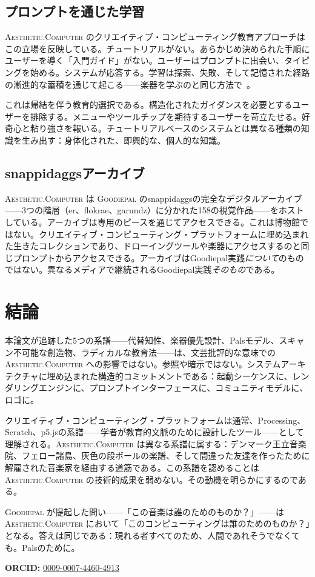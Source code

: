 \documentclass[10pt,letterpaper,twocolumn]{article}
\newcommand{\ac}{\textsc{Aesthetic.Computer}}
\newcommand{\gp}{\textsc{Goodiepal}}
\begin{document}
\subsection{プロンプトを通じた学習}

\ac{} のクリエイティブ・コンピューティング教育アプローチはこの立場を反映している。チュートリアルがない。あらかじめ決められた手順にユーザーを導く「入門ガイド」がない。ユーザーはプロンプトに出会い、タイピングを始める。システムが応答する。学習は探索、失敗、そして記憶された経路の漸進的な蓄積を通じて起こる——楽器を学ぶのと同じ方法で~\citep{papert1980mindstorms}。

これは帰結を伴う教育的選択である。構造化されたガイダンスを必要とするユーザーを排除する。メニューやツールチップを期待するユーザーを苛立たせる。好奇心と粘り強さを報いる。チュートリアルベースのシステムとは異なる種類の知識を生み出す：身体化された、即興的な、個人的な知識。

\subsection{snappidaggsアーカイブ}

\ac{} は \gp{} のsnappidaggsの完全なデジタルアーカイブ——3つの階層（er、flokrae、garundz）に分かれた158の視覚作品——をホストしている。アーカイブは専用のピースを通じてアクセスできる。これは博物館ではない。クリエイティブ・コンピューティング・プラットフォームに埋め込まれた生きたコレクションであり、ドローイングツールや楽器にアクセスするのと同じプロンプトからアクセスできる。アーカイブはGoodiepal実践\emph{について}のものではない。異なるメディアで継続されるGoodiepal実践\emph{そのもの}である。

\section{結論}

本論文が追跡した5つの系譜——代替知性、楽器優先設計、Palsモデル、スキャン不可能な創造物、ラディカルな教育法——は、文芸批評的な意味での \ac{} への影響ではない。参照や暗示ではない。システムアーキテクチャに埋め込まれた構造的コミットメントである：起動シーケンスに、レンダリングエンジンに、プロンプトインターフェースに、コミュニティモデルに、ロゴに。

クリエイティブ・コンピューティング・プラットフォームは通常、Processing、Scratch、p5.jsの系譜——学者が教育的文脈のために設計したツール——として理解される。\ac{} は異なる系譜に属する：デンマーク王立音楽院、フェロー諸島、灰色の段ボールの楽譜、そして間違った友達を作ったために解雇された音楽家を経由する道筋である。この系譜を認めることは \ac{} の技術的成果を弱めない。その動機を明らかにするのである。

\gp{} が提起した問い——「この音楽は誰のためのものか？」——は \ac{} において「このコンピューティングは誰のためのものか？」となる。答えは同じである：現れる者すべてのため、人間であれそうでなくても。Palsのために。

\vspace{0.5em}
\noindent\textbf{ORCID:} \href{https://orcid.org/0009-0007-4460-4913}{0009-0007-4460-4913}



\end{document}

